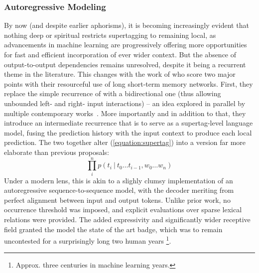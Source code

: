 \subsubsection{Autoregressive Modeling}
By now (and despite earlier aphorisms), it is becoming increasingly evident that nothing deep or spiritual restricts supertagging to remaining local, as advancements in machine learning are progressively offering more opportunities for fast and efficient incorporation of ever wider context.
But the absence of output-to-output dependencies remains unresolved, despite it being a recurrent theme in the literature.
This changes with the work of \citet{vaswani-etal-2016-supertagging} who score two major points with their resourceful use of long short-term memory networks.
First, they replace the simple recurrence of \citet{xu-etal-2015-ccg} with a bidirectional one (thus allowing unbounded left- and right- input interactions) --  an idea explored in parallel by multiple contemporary works~\cite[\textit{inter alia}]{ling-etal-2015-finding,xu-etal-2016, lewis-etal-2016-lstm}.
More importantly and in addition to that, they introduce an intermediate recurrence that is to serve as a supertag-level language model, fusing the prediction history with the input context to produce each local prediction.
The two together alter (\ref{equation:supertag}) into a version far more elaborate than previous proposals:
\begin{equation}
	\prod_i^n p(t_i \ | \ t_0\dots t_{i-1},w_0\dots w_n)
\end{equation}
Under a modern lens, this is akin to a slighly clumsy implementation of an autoregressive sequence-to-sequence model, with the decoder meriting from perfect alignment between input and output tokens.
Unlike prior work, no occurrence threshold was imposed, and explicit evaluations over sparse lexical relations were provided.
The added expressivity and significantly wider receptive field granted the model the state of the art badge, which was to remain uncontested for a surprisingly long two human years%
	\footnote{Approx. three centuries in machine learning years.}.

